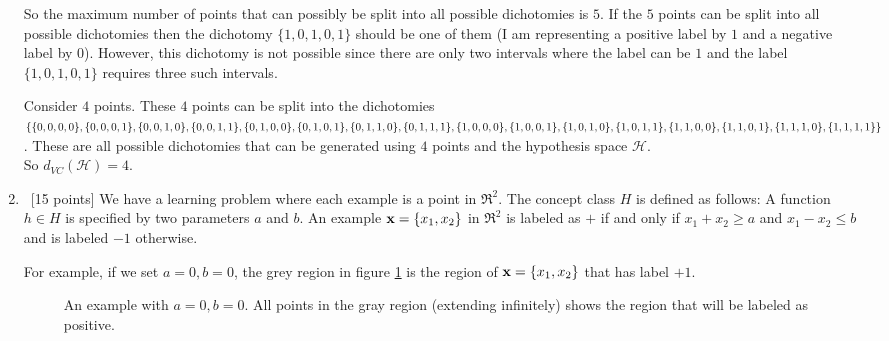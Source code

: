 \begin{enumerate}
So the maximum number of points that can possibly be split into all possible dichotomies is $5$. If the $5$ points can be split into all possible dichotomies then the dichotomy $\{1,0,1,0,1\}$ should be one of them (I am representing a positive label by $1$ and a negative label by $0$). However, this dichotomy is not possible since there are only two intervals where the label can be $1$ and the label $\{1,0,1,0,1\}$ requires three such intervals.

Consider $4$ points. These $4$ points can be split into the dichotomies $\{\{0,0,0,0\},\{0,0,0,1\},\\\{0,0,1,0\},\{0,0,1,1\},\{0,1,0,0\},\{0,1,0,1\},\{0,1,1,0\},\{0,1,1,1\},\{1,0,0,0\},\{1,0,0,1\},\\\{1,0,1,0\},\{1,0,1,1\},\{1,1,0,0\},\{1,1,0,1\},\{1,1,1,0\},\{1,1,1,1\}\}$. These are all possible dichotomies that can be generated using $4$ points and the hypothesis space $\mathcal{H}$.\\ 

So $d_{VC}(\mathcal{H}) = 4$.

\item ~[15 points] We have a learning problem where each example is a
  point in $\Re^2$. The concept class $H$ is defined as follows: A
  function $h \in H$ is specified by two parameters $a$ and $b$. An
  example ${\bf x} = \{x_1, x_2\}$ in $\Re^2$ is labeled as $+$ if and
  only if $x_1 + x_2 \geq a$ and $x_1 - x_2 \leq b$ and is labeled $-1$
  otherwise.

  For example, if we set $a = 0, b = 0$, the grey region in figure
  \ref{f1} is the region of ${\bf x} = \{x_1, x_2\}$ that has label
  $+1$.

  \begin{figure}[h!]
    \centering
    \caption{An example with $a = 0, b = 0$. All points in the gray region
      (extending infinitely) shows the region that will be labeled as
      positive.} \label{f1}
  \end{figure}




\end{enumerate}
